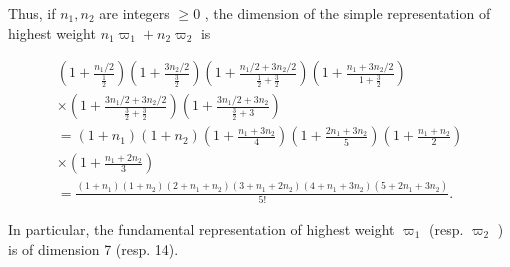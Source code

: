 Thus, if \(n_1, n_2\) are integers \(\geq 0\) , the dimension of the simple representation of highest weight \(n_1\varpi_1 + n_2\varpi_2\) is

\[
\begin{array}{c} \left(1 + \frac {n _ {1} / 2}{\frac {1}{2}}\right) \left(1 + \frac {3 n _ {2} / 2}{\frac {3}{2}}\right) \left(1 + \frac {n _ {1} / 2 + 3 n _ {2} / 2}{\frac {1}{2} + \frac {3}{2}}\right) \left(1 + \frac {n _ {1} + 3 n _ {2} / 2}{1 + \frac {3}{2}}\right) \\ \times \left(1 + \frac {3 n _ {1} / 2 + 3 n _ {2} / 2}{\frac {3}{2} + \frac {3}{2}}\right) \left(1 + \frac {3 n _ {1} / 2 + 3 n _ {2}}{\frac {3}{2} + 3}\right) \\ = (1 + n _ {1}) (1 + n _ {2}) \left(1 + \frac {n _ {1} + 3 n _ {2}}{4}\right) \left(1 + \frac {2 n _ {1} + 3 n _ {2}}{5}\right) \left(1 + \frac {n _ {1} + n _ {2}}{2}\right) \\ \times \left(1 + \frac {n _ {1} + 2 n _ {2}}{3}\right) \\ = \frac {(1 + n _ {1}) (1 + n _ {2}) (2 + n _ {1} + n _ {2}) (3 + n _ {1} + 2 n _ {2}) (4 + n _ {1} + 3 n _ {2}) (5 + 2 n _ {1} + 3 n _ {2})}{5 !}. \end{array}
\]

In particular, the fundamental representation of highest weight \(\varpi_{1}\) (resp. \(\varpi_{2}\) ) is of dimension 7 (resp. 14).

